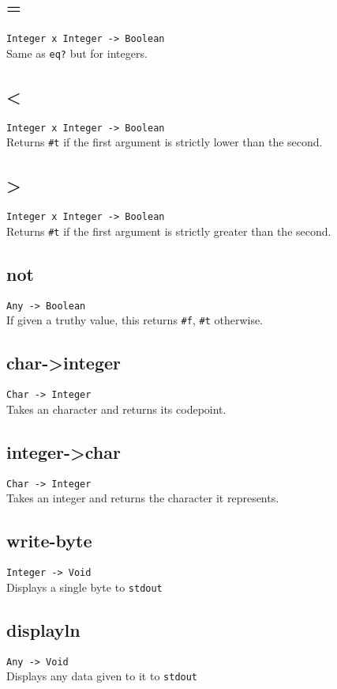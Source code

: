 \subsection*{=}
\texttt{Integer x Integer -> Boolean}\\
\noindent Same as \texttt{eq?} but for integers.

\subsection*{<}
\texttt{Integer x Integer -> Boolean}\\
\noindent Returns \texttt{\#t} if the first argument is strictly lower than the second.

\subsection*{>}
\texttt{Integer x Integer -> Boolean}\\
\noindent Returns \texttt{\#t} if the first argument is strictly greater than the second.

\subsection*{not}
\texttt{Any -> Boolean}\\
\noindent If given a truthy value, this returns \texttt{\#f}, \texttt{\#t} otherwise.

\subsection*{char->integer}
\texttt{Char -> Integer}\\
\noindent Takes an character and returns its codepoint.

\subsection*{integer->char}
\texttt{Char -> Integer}\\
\noindent Takes an integer and returns the character it represents.

\subsection*{write-byte}
\texttt{Integer -> Void}\\
\noindent Displays a single byte to \texttt{stdout}

\subsection*{displayln}
\texttt{Any -> Void}\\
\noindent Displays any data given to it to \texttt{stdout}

